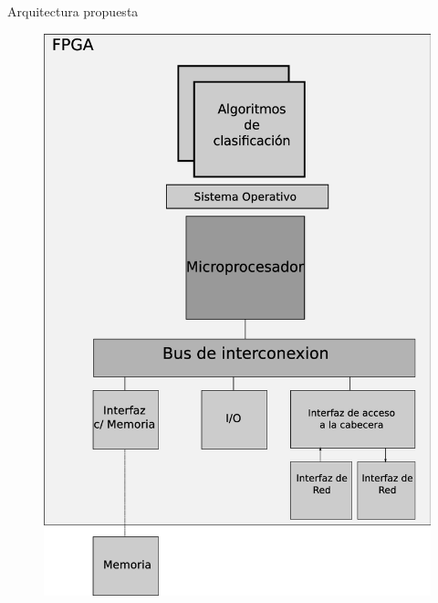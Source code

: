 \documentclass[xcolor=dvipsnames]{beamer}
\begin{document}
\begin{frame}{Arquitectura propuesta}
   	\begin{figure}
   		\centering
    		\includegraphics[scale=0.17]{figures/solucion.eps}
    	\end{figure}
\end{frame}
\end{document}
